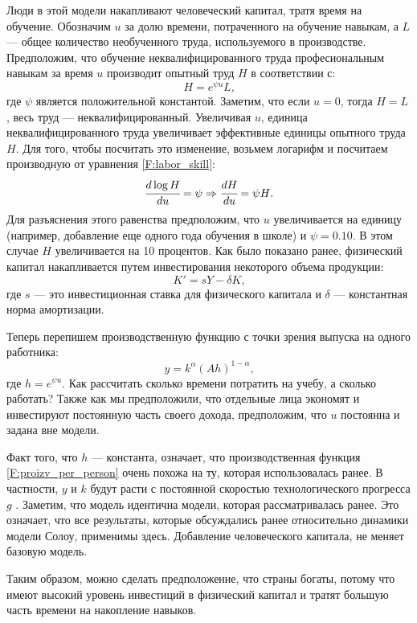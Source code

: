 Люди в этой модели накапливают человеческий капитал, тратя время на обучение.
Обозначим $u$ за долю времени, потраченного на обучение навыкам, а $L$ --- общее количество необученного труда, используемого в производстве.
Предположим, что обучение неквалифицированного труда професиональным навыкам за время $u$ производит опытный труд $H$ в соответствии с:
\begin{equation}
H=e^{\psi u} L \text{,}
\label{F:labor_skill}
\end{equation}
где $\psi$ является положительной константой.
Заметим, что если $u = 0$, тогда $H = L$, весь труд --- неквалифицированный.
Увеличивая $u$, единица неквалифицированного труда увеличивает эффективные единицы опытного труда $H$.
Для того, чтобы посчитать это изменение, возьмем логарифм и посчитаем производную от уравнения \ref{F:labor_skill}:
\begin{equation*}
\cfrac{d \log{H}}{du} = \psi \Rightarrow \cfrac{dH}{du}=\psi H\text{.}
\end{equation*}
Для разъяснения этого равенства предположим, что $u$ увеличивается на единицу (например, добавление еще одного года обучения в школе) и $\psi = 0.10$.
В этом случае $H$ увеличивается на 10 процентов.
Как было показано ранее, физический капитал накапливается путем инвестирования некоторого объема продукции:
\begin{equation*}
K'=sY - \delta K \text{,}
\end{equation*}
где $s$ --- это инвестиционная ставка для физического капитала и $\delta$ --- константная норма амортизации.

Теперь перепишем производственную функцию с точки зрения выпуска на одного работника:
\begin{equation}
y = k^{\alpha}\left(Ah\right)^{1 - \alpha}\text{,}
\label{F:proizv_per_person}
\end{equation}
где $h=e^{\psi u}$.
Как рассчитать сколько времени потратить на учебу, а сколько работать?
Также как мы предположили, что отдельные лица экономят и инвестируют постоянную часть своего дохода, предположим, что $u$ постоянна и задана вне модели.

Факт того, что $h$ --- константа, означает, что производственная функция \ref{F:proizv_per_person} очень похожа на ту, которая использовалась ранее.
В частности, $y$ и $k$ будут расти с постоянной скоростью технологического прогресса $g$ .
Заметим, что модель идентична модели, которая рассматривалась ранее.
Это означает, что все результаты, которые обсуждались ранее относительно динамики модели Солоу, применимы здесь.
Добавление человеческого капитала, не меняет базовую модель.

Таким образом, можно сделать предположение, что страны богаты, потому что имеют высокий уровень инвестиций в физический капитал и тратят большую часть времени на накопление навыков.
